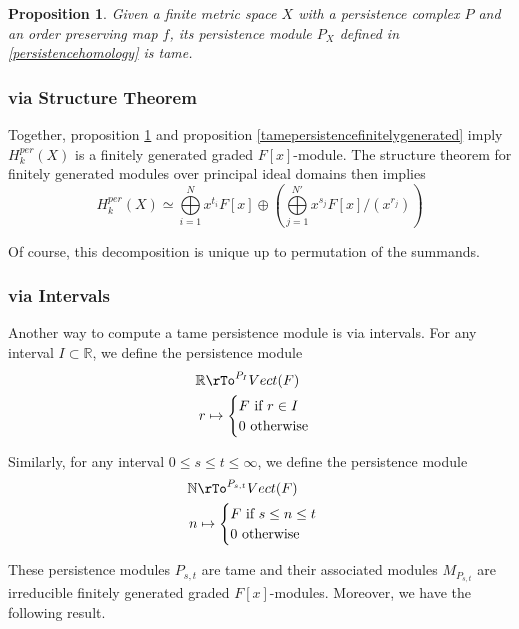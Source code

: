 \documentclass[12pt]{amsart}
\newtheorem{proposition}[theorem]{Proposition}
\theoremstyle{definition}
\begin{document}
\begin{proposition}\label{Xspersistencemoduleistame} Given a finite metric space $X$ with a persistence complex $P$ and an order preserving map $f$, its persistence module $P_X$ defined in \ref{persistencehomology} is tame.
\end{proposition}

\subsubsection{via Structure Theorem} Together, proposition \ref{Xspersistencemoduleistame} and proposition \ref{tamepersistencefinitelygenerated} imply $H_k^{per}(X)$ is a finitely generated graded $F[x]$-module. The structure theorem for finitely generated modules over principal ideal domains then implies
$$H_k^{per}(X) \simeq \bigoplus \limits_{i=1}^N x^{t_i}F[x] \oplus \left( \bigoplus \limits_{j=1}^{N'} x^{s_j} F[x]/(x^{r_j}) \right)$$

Of course, this decomposition is unique up to permutation of the summands.

\subsubsection{via Intervals} Another way to compute a tame persistence module is via intervals. For any interval $I \subset \mathbb{R}$, we define the persistence module
\begin{align*}
\mathbb{R} & \rTo^{P_I} Vect(F) \\
r & \mapsto \begin{cases} F \text{ if } r \in I \\ 0 \text{ otherwise} \end{cases}
\end{align*}

Similarly, for any interval $0 \leq s \leq t \leq \infty$, we define the persistence module
\begin{align*}
\mathbb{N} & \rTo^{P_{s,t}} Vect(F) \\
n & \mapsto \begin{cases} F \text{ if } s \leq n \leq t \\ 0 \text{ otherwise} \end{cases}
\end{align*}

These persistence modules $P_{s,t}$ are tame and their associated modules $M_{P_{s,t}}$ are irreducible finitely generated graded $F[x]$-modules. Moreover, we have the following result.
\end{document}
